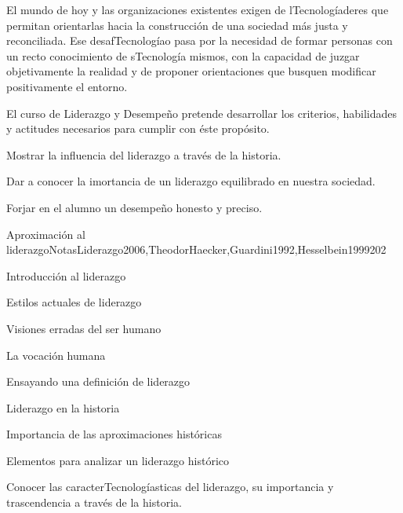 \begin{syllabus}


\begin{justification}
El mundo de hoy y las organizaciones existentes exigen de lTecnologíaderes que permitan orientarlas hacia la construcción de una sociedad más justa y reconciliada.  Ese desafTecnologíao pasa por la necesidad de formar personas con un recto conocimiento de sTecnología mismos, con la capacidad de juzgar objetivamente la realidad y de proponer orientaciones que busquen modificar positivamente el entorno.

El curso de Liderazgo y Desempeño pretende desarrollar los criterios, habilidades y actitudes necesarios para cumplir con éste propósito.
\end{justification}

\begin{goals}
\item \OutcomeHU
\item Mostrar la influencia del liderazgo a través de la historia.
\item Dar a conocer la imortancia de un liderazgo equilibrado en nuestra sociedad.
\item Forjar en el alumno un desempeño honesto y preciso.
\end{goals}

\begin{outcomes}
\end{outcomes}

\begin{unit}{Aproximación al liderazgo}{NotasLiderazgo2006,TheodorHaecker,Guardini1992,Hesselbein1999}{20}{2}
\begin{topics}
	\item Introducción al liderazgo
	\item Estilos actuales de liderazgo
	\item Visiones erradas del ser humano
	\item La vocación humana
	\item Ensayando una definición de liderazgo
	\item Liderazgo en la historia
	\item Importancia de las aproximaciones históricas
	\item Elementos para analizar un liderazgo histórico
\end{topics}
\begin{learningoutcomes}
	\item Conocer las caracterTecnologíasticas del liderazgo, su importancia y trascendencia a través de la historia.
\end{learningoutcomes}
\end{unit}


\end{syllabus}
